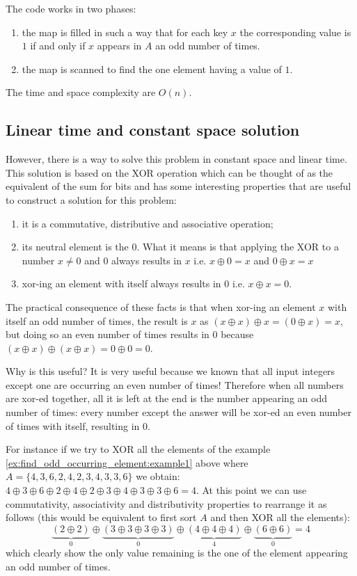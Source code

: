The code works in two phases:
\begin{enumerate}
	\item the map  is filled in such a way that for each key $x$ the corresponding value is $1$ if and only if $x$ appears in $A$ an odd number of times.
	\item the map is scanned to find the one element having a value of $1$.
\end{enumerate}
The time and space complexity are $O(n)$.

\subsection{Linear time and constant space solution}
\label{find_odd_occurring_element:sec:constant_space}

However, there is a way to solve this problem in constant space and linear time. 
This solution is based on the XOR operation which can be thought of as the equivalent of the sum for bits and has some interesting properties that are useful to construct a solution for this problem:
\begin{enumerate}
	\item it is a commutative, distributive and associative operation;
	\item its neutral element is the $0$. What it means is that applying the XOR to a number $x \neq 0$ and $0$  always results in $x$ i.e. $x \oplus 0 = x$ and $0 \oplus x = x$
	\item xor-ing an element with itself always results in 0 i.e. $x \oplus x = 0$.
\end{enumerate}
The practical consequence of these facts is that when xor-ing an element $x$ with itself an odd number of times, the result is $x$ as $(x \oplus x) \oplus x  = (0 \oplus x) = x$, but doing so an even number of times results in $0$ because  $(x \oplus x) \oplus (x \oplus x) = 0 \oplus 0 = 0$.

Why is this useful? It is very useful because we known that all input integers except one are occurring an even number of times! Therefore when all numbers are xor-ed together, all it is left at the end is the number appearing an odd number of times: every number except the answer will be xor-ed an even number of times with itself, resulting in $0$. 


For instance if we try to XOR all the elements of the example \ref{ex:find_odd_occurring_element:example1} above where $A=\{4,3,6,2,4,2,3,4,3,3,6\}$ we obtain: $4 \oplus 3 \oplus  6 \oplus 2 \oplus 4 \oplus 2 \oplus 3 \oplus 4 \oplus 3 \oplus 3 \oplus 6 = 4$. At this point we can use commutativity, associativity and distributivity properties to rearrange it as follows (this would be equivalent to first sort $A$ and then XOR all the elements): 
$$\underbrace{(2 \oplus 2)}_{0} \oplus \underbrace{(3 \oplus 3 \oplus 3 \oplus 3)}_{0} \oplus \underbrace{(4 \oplus 4 \oplus 4)}_{4} \oplus \underbrace{(6 \oplus 6)}_{0} = 4$$ which clearly show the only value remaining is the one of the element appearing an odd number of times.


